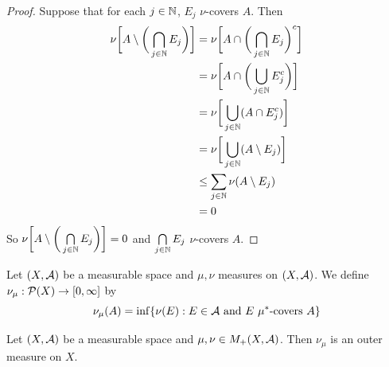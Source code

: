 \documentclass{book}
\begin{document}
	\begin{proof}
		Suppose that for each $j \in \mathbb{N}$, $E_j$ $\nu$-covers $A$. Then 
		\begin{align*}
			\nu \bigg[ A \setminus \bigg( \bigcap_{j \in \mathbb{N}} E_j \bigg) \bigg]
			& = \nu \bigg[ A \cap \bigg( \bigcap_{j \in \mathbb{N}} E_j \bigg)^c \bigg] \\
			& = \nu \bigg[ A \cap \bigg( \bigcup_{j \in \mathbb{N}} E_j^c \bigg) \bigg] \\
			& = \nu \bigg[ \bigcup_{j \in \mathbb{N}} (A \cap E_j^c) \bigg] \\
			& = \nu \bigg[ \bigcup_{j \in \mathbb{N}} (A \setminus E_j) \bigg] \\
			& \leq \sum\limits_{j \in \mathbb{N}} \nu(A \setminus E_j) \\
			& = 0
		\end{align*}
		So $\nu \bigg[ A \setminus \bigg( \bigcap\limits_{j \in \mathbb{N}} E_j \bigg) \bigg] = 0$ and $\bigcap\limits_{j \in \mathbb{N}} E_j$ $\nu$-covers $A$.
	\end{proof}
	
	\begin{defn}  
		Let $(X, \mathcal{A})$ be a measurable space and $\mu,\nu$ measures on $(X, \mathcal{A})$. We define $\nu_{\mu}: \mathcal{P}(X) \rightarrow [0,\infty]$ by 
		$$\nu_{\mu}(A) = \inf \{\nu(E): E \in \mathcal{A} \text{ and $E$ $\mu^*$-covers $A$} \}$$
	\end{defn}
	
	\begin{ex}   
		Let $(X, \mathcal{A})$ be a measurable space and $\mu,\nu \in M_+(X, \mathcal{A})$. Then $\nu_{\mu}$ is an outer measure on $X$.
	\end{ex}
	
\end{document}
